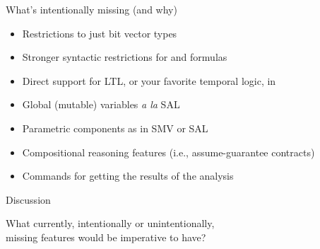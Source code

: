 \documentclass[10pt,aspectratio=149]{beamer}
\begin{document}
\begin{frame}{What's intentionally missing (and why)}
\smallskip

\begin{itemize}
\item
Restrictions to just bit vector types \\[.5ex]
\smallskip

\item
Stronger syntactic restrictions for \inita and \transa formulas \\[.5ex]
\smallskip

\item
Direct support for LTL, or your favorite temporal logic, in \checksys \\[.5ex]
\smallskip

\item
Global (mutable) variables \emph{a la} SAL \\[.5ex]
\smallskip

\item
Parametric components as in SMV or SAL \\[.5ex] 
\smallskip

\item
Compositional reasoning features
(i.e., assume-guarantee contracts) \\[.5ex]
\smallskip

\item
Commands for getting the results of the analysis \\[.5ex]
\end{itemize}

\end{frame}


\begin{frame}{Discussion}
\Large
\centering

What currently, intentionally or unintentionally, \\[.4ex]
missing features would be imperative to have?

\end{frame}
\end{document}
